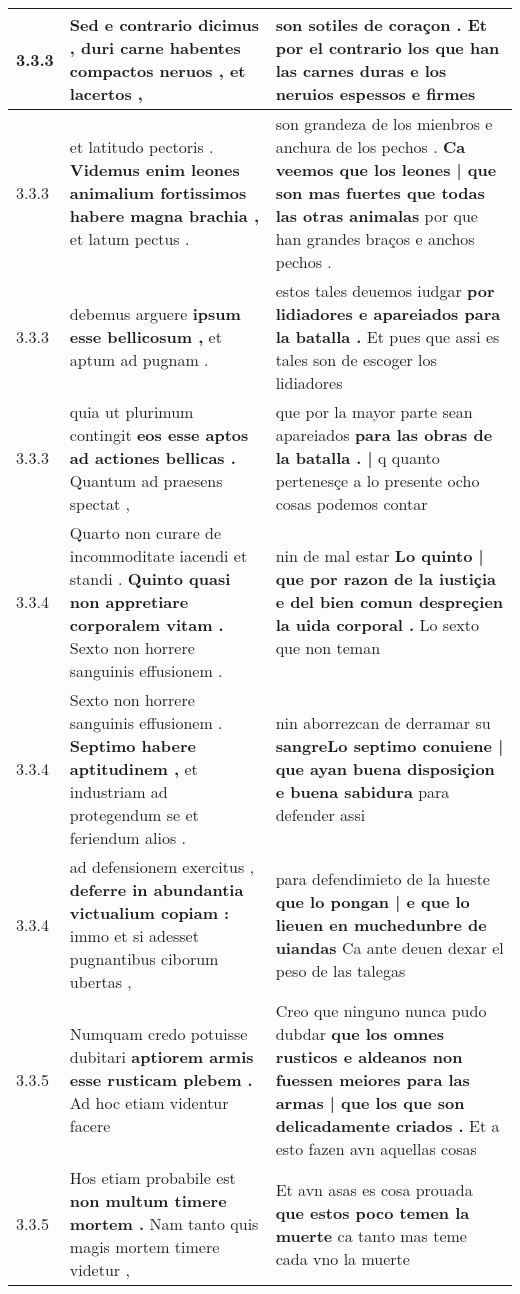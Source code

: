 \begin{tabular}{|p{1cm}|p{6.5cm}|p{6.5cm}|}
3.3.3 & Sed e contrario dicimus , \textbf{ duri carne habentes compactos neruos , } et lacertos , & son sotiles de coraçon . \textbf{ Et por el contrario los que han las carnes duras } e los neruios espessos e firmes \\\hline
3.3.3 & et latitudo pectoris . \textbf{ Videmus enim leones animalium fortissimos habere magna brachia , } et latum pectus . & son grandeza de los mienbros e anchura de los pechos . \textbf{ Ca veemos que los leones | que son mas fuertes que todas las otras animalas } por que han grandes braços e anchos pechos . \\\hline
3.3.3 & debemus arguere \textbf{ ipsum esse bellicosum , } et aptum ad pugnam . & estos tales deuemos iudgar \textbf{ por lidiadores e apareiados para la batalla . } Et pues que assi es tales son de escoger los lidiadores \\\hline
3.3.3 & quia ut plurimum contingit \textbf{ eos esse aptos ad actiones bellicas . } Quantum ad praesens spectat , & que por la mayor parte sean apareiados \textbf{ para las obras de la batalla . |  } q quanto pertenesçe a lo presente ocho cosas podemos contar \\\hline
3.3.4 & Quarto non curare de incommoditate iacendi et standi . \textbf{ Quinto quasi non appretiare corporalem vitam . } Sexto non horrere sanguinis effusionem . & nin de mal estar \textbf{ Lo quinto | que por razon de la iustiçia e del bien comun despreçien la uida corporal . } Lo sexto que non teman \\\hline
3.3.4 & Sexto non horrere sanguinis effusionem . \textbf{ Septimo habere aptitudinem , } et industriam ad protegendum se et feriendum alios . & nin aborrezcan de derramar su \textbf{ sangreLo septimo conuiene | que ayan buena disposiçion e buena sabidura } para defender assi \\\hline
3.3.4 & ad defensionem exercitus , \textbf{ deferre in abundantia victualium copiam : } immo et si adesset pugnantibus ciborum ubertas , & para defendimieto de la hueste \textbf{ que lo pongan | e que lo lieuen en muchedunbre de uiandas } Ca ante deuen dexar el peso de las talegas \\\hline
3.3.5 & Numquam credo potuisse dubitari \textbf{ aptiorem armis esse rusticam plebem . } Ad hoc etiam videntur facere & Creo que ninguno nunca pudo dubdar \textbf{ que los omnes rusticos e aldeanos non fuessen meiores para las armas | que los que son delicadamente criados . } Et a esto fazen avn aquellas cosas \\\hline
3.3.5 & Hos etiam probabile est \textbf{ non multum timere mortem . } Nam tanto quis magis mortem timere videtur , & Et avn asas es cosa prouada \textbf{ que estos poco temen la muerte } ca tanto mas teme cada vno la muerte \\\hline

\end{tabular}
